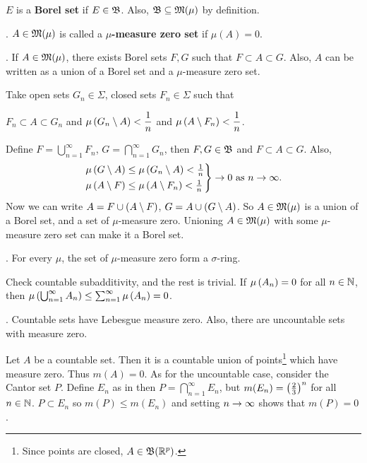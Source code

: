 \rmk \(E\) is a \textbf{Borel set} if \(E \in \mathfrak{B}\). Also, \(\mathfrak{B} \subseteq \mathfrak{M}(\mu)\) by definition.

.  \(A \in \mathfrak{M}(\mu)\) is called a \textbf{\(\mu\)-measure zero set} if \(\mu(A) = 0\).

\prop. If \(A \in \mathfrak{M}(\mu)\), there exists Borel sets \(F, G\) such that \(F \subset A \subset G\). Also, \(A\) can be written as a union of a Borel set and a \(\mu\)-measure zero set.

\pf Take open sets \(G_n \in \Sigma\), closed sets \(F_n \in \Sigma\) such that
\begin{center}
    \(F_n \subset A \subset G_n\) and \(\displaystyle \mu\left( G_n \setminus A \right) < \frac{1}{n}\) and \(\displaystyle \mu\left( A \setminus F_n \right) < \frac{1}{n}\).
\end{center}
Define \(F = \bigcup_{n=1}^{\infty} F_n\), \(G = \bigcap_{n=1}^{\infty} G_n\), then \(F, G \in \mathfrak{B}\) and \(F \subset A \subset G\). Also,
\[
    \begin{rcases}
        \mu\left( G \setminus A \right)\leq \mu\left( G_n \setminus A \right) < \frac{1}{n} \\
        \mu\left( A \setminus F \right) \leq \mu\left( A \setminus F_n \right) < \frac{1}{n}
    \end{rcases} \rightarrow 0 \text{ as } n \rightarrow \infty.
\]
Now we can write \(A = F \cup (A \setminus F)\), \(G = A \cup (G \setminus A)\). So \(A \in \mathfrak{M}(\mu)\) is a union of a Borel set, and a set of \(\mu\)-measure zero. Unioning \(A\in \mathfrak{M}(\mu)\) with some \(\mu\)-measure zero set can make it a Borel set.

\prop. For every \(\mu\), the set of \(\mu\)-measure zero form a \(\sigma\)-ring.

\pf Check countable subadditivity, and the rest is trivial. If \(\mu\left( A_n \right) = 0\) for all \(n\in \mathbb{N}\), then \(\mu\left( \bigcup_{n=1}^{\infty} A_n \right) \leq \sum_{n=1}^{\infty} \mu\left( A_n \right) = 0\).

\prop. Countable sets have Lebesgue measure zero. Also, there are uncountable sets with measure zero.

\pf Let \(A\) be a countable set. Then it is a countable union of points\footnote{Since points are closed, \(A \in \mathfrak{B}(\mathbb{R}^p)\).} which have measure zero. Thus \(m(A) = 0\). As for the uncountable case, consider the Cantor set \(P\). Define \(E_n\) as in {} then \(P = \bigcap_{n=1}^{\infty} E_n\), but \(m(E_n) = \left( \frac{2}{3} \right)^n\) for all \(n \in \mathbb{N}\). \(P \subset E_n\) so \(m(P)\leq m(E_n)\) and setting \(n \rightarrow \infty\) shows that \(m(P) = 0\).

